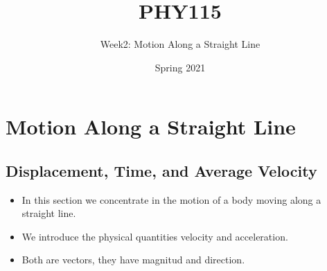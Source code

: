 \documentclass[]{beamer}
\title{PHY115}    %
\author{Week2: Motion Along a Straight Line}                 %
\institute{Digipen}      %
\date{Spring 2021}
\begin{document}
\begin{frame}
  \titlepage
\end{frame}

\section[]{}

\begin{frame}
  \tableofcontents
\end{frame}

\section{Motion Along a Straight Line}
\subsection{Displacement, Time, and Average Velocity}

  

\begin{frame}

\begin{itemize}
\item  In this section we concentrate in the motion of a body moving
along a straight line.
\pause
\item  We introduce the physical quantities velocity and acceleration.
\pause
\item Both are vectors, they have magnitud and direction.
\end{itemize}
 
    

\end{frame}
\end{document}
